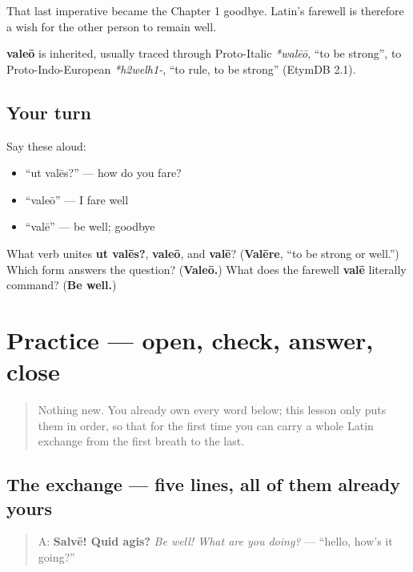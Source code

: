 That last imperative became the Chapter 1 goodbye. Latin's farewell is therefore a wish for the other person to remain well.

\begin{cousinweb}
\textbf{valeō} is inherited, usually traced through Proto-Italic \emph{*walēō}, \textquotedblleft{}to be strong\textquotedblright{}, to Proto-Indo-European \emph{*h2welh1-}, \textquotedblleft{}to rule, to be strong\textquotedblright{} (EtymDB 2.1).
\end{cousinweb}

\subsection*{Your turn}
Say these aloud:

\begin{itemize}
\raggedright
  \item \textquotedblleft{}ut valēs?\textquotedblright{} — how do you fare?
  \item \textquotedblleft{}valeō\textquotedblright{} — I fare well
  \item \textquotedblleft{}valē\textquotedblright{} — be well; goodbye
\end{itemize}

\begin{tcolorbox}[breakable,colback=teal!4,colframe=teal!35!black,title={Before you move on}]
What verb unites \textbf{ut valēs?}, \textbf{valeō}, and \textbf{valē}? (\textbf{Valēre}, \textquotedblleft{}to be strong or well.\textquotedblright{}) Which form answers the question? (\textbf{Valeō.}) What does the farewell \textbf{valē} literally command? (\textbf{Be well.})
\end{tcolorbox}
\section[Practice]{Practice — open, check, answer, close}

\label{lesson:LA-C19-practice}



\begin{quote}
Nothing new. You already own every word below; this lesson only puts them in order, so that for the first time you can carry a whole Latin exchange from the first breath to the last.
\end{quote}

\subsection*{The exchange — five lines, all of them already yours}
\begin{quote}
A: \textbf{Salvē! Quid agis?} \emph{Be well! What are you doing?} — \textquotedblleft{}hello, how's it going?\textquotedblright{}
\end{quote}

